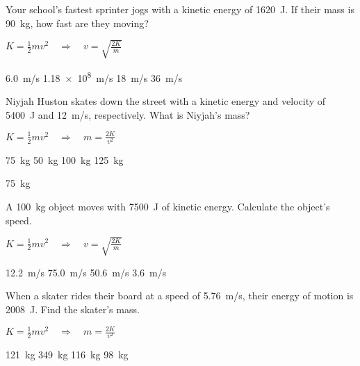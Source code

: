 \documentclass[]{exam}
\begin{document}
\begin{questions}
\question \label{rUr2P8}
Your school's fastest sprinter jogs with a kinetic energy of \SI{1620}{J}. If their mass is \SI{90}{kg}, how fast are they moving?

\ifprintanswers
{\color{red}
$K = \frac{1}{2} m v^2 \quad \Rightarrow \quad v = \sqrt{\frac{2K}{m}}$
}
\fi

\begin{randomizechoices}
    \correctchoice \SI{6.0}{m/s}
    \choice \SI{1.18e8}{m/s}
    \choice \SI{18}{m/s}
    \choice \SI{36}{m/s}
\end{randomizechoices}


\question \label{2rrR9W}
Niyjah Huston skates down the street with a kinetic energy and velocity of \SI{5400}{J} and \SI{12}{m/s}, respectively. What is Niyjah's mass?

\ifprintanswers
{\color{red}
$K = \frac{1}{2} m v^2 \quad \Rightarrow \quad m = \frac{2K}{v^2}$
}
\fi

\begin{randomizechoices}
    \correctchoice \SI{75}{kg}
    \choice \SI{50}{kg}
    \choice \SI{100}{kg}
    \choice \SI{125}{kg}
\end{randomizechoices}

\begin{solution}
\SI{75}{kg}
\end{solution}

\question \label{gHlhnM}
A \SI{100}{kg} object moves with \SI{7500}{J} of kinetic energy. Calculate the object's speed.

\ifprintanswers
{\color{red}
$K = \frac{1}{2} m v^2 \quad \Rightarrow \quad v = \sqrt{\frac{2K}{m}}$
}
\fi

\begin{randomizechoices}
    \correctchoice \SI{12.2}{m/s}
    \choice \SI{75.0}{m/s}
    \choice \SI{50.6}{m/s}
    \choice \SI{3.6}{m/s}
\end{randomizechoices}



\question \label{WH6xot}
When a skater rides their board at a speed of \SI{5.76}{m/s}, their energy of motion is \SI{2008}{J}. Find the skater's mass.

\ifprintanswers
{\color{red}
$K = \frac{1}{2} m v^2 \quad \Rightarrow \quad m = \frac{2K}{v^2}$
}
\fi

\begin{randomizechoices}
    \correctchoice \SI{121}{kg}
    \choice \SI{349}{kg}
    \choice \SI{116}{kg}
    \choice \SI{98}{kg}
\end{randomizechoices}


\end{questions}
\end{document}
